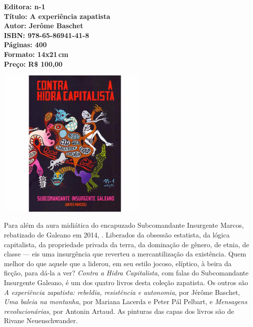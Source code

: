 \vfill

\hspace*{-.4cm}\begin{minipage}[c]{.5\linewidth}
\small\textbf{
\hspace*{-.1cm}Editora: n-1\\
Título: A experiência zapatista\\
Autor: Jerôme Baschet\\
ISBN: 978-65-86941-41-8\\
Páginas: 400\\
Formato: 14x21\,cm\\
Preço: R\$ 100,00\\
}
\end{minipage}

\pagebreak

\pagebreak

\begin{center}
\hspace*{-3.6cm}
\hspace*{3.1cm}\includegraphics[width=74mm]{./CAPAS/N-1_HIDRA.jpg}
\end{center}

\hspace*{-7cm}\hrulefill\hspace*{-7cm}

\medskip

\noindent{}Para além da aura midiática do encapuzado Subcomandante Insurgente Marcos, rebatizado de Galeano em 2014, . Liberados da obsessão estatista, da lógica capitalista, da propriedade privada da terra, da dominação de gênero, de etnia, de classe --- eis uma insurgência que reverteu a mercantilização da existência. Quem melhor do que aquele que a liderou, em seu estilo jocoso, elíptico, à beira da ficção, para dá-la a ver? \textit{Contra a Hidra Capitalista}, com falas do Subcomandante Insurgente Galeano, é um dos quatro livros desta coleção zapatista. Os outros são \textit{A experiência zapatista: rebeldia, resistência e autonomia}, por Jérôme Baschet, \textit{Uma baleia na montanha}, por Mariana Lacerda e Peter Pál Pelbart, e \textit{Mensagens revolucionárias}, por Antonin Artaud. As pinturas das capas dos livros são de Rivane Neuenschwander.

